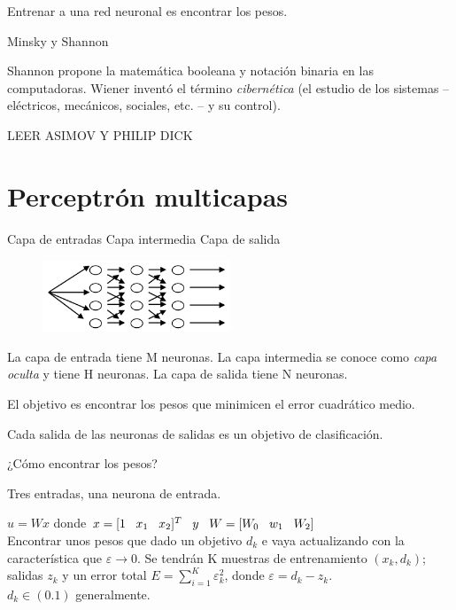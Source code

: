 \begin{nota} Entrenar a una red neuronal es encontrar los pesos. \end{nota}


Minsky y Shannon

Shannon propone la matemática booleana y notación binaria en las computadoras.
Wiener inventó el término \textit{cibernética} (el estudio de los sistemas – eléctricos, mecánicos, sociales, etc. – y su control).


LEER ASIMOV Y PHILIP DICK

\section{Perceptrón multicapas}

Capa de entradas
Capa intermedia
Capa de salida

\begin{figure}[h!]
	\centering
	\includegraphics[width=0.5\textwidth]{images/img76.png}
	\label{figura76}
\end{figure}

La capa de entrada tiene M neuronas.
La capa intermedia se conoce como \textit{capa oculta} y tiene H neuronas.
La capa de salida tiene N neuronas.

El objetivo es encontrar los pesos que minimicen el error cuadrático medio.


Cada salida de las neuronas de salidas es un objetivo de clasificación.

\begin{ejemplo}
	
¿Cómo encontrar los pesos?

Tres entradas, una neurona de entrada.

$u=Wx$ donde $x = [1 \hspace{0.3cm} x_1 \hspace{0.3cm}  x_2]^T \hspace{0.3cm} y \hspace{0.3cm} W= [W_0 \hspace{0.3cm} w_1 \hspace{0.3cm} W_2]$
\\

Encontrar unos pesos que dado un objetivo $d_k$ e vaya actualizando con la característica que $\varepsilon \rightarrow 0$. Se
tendrán K muestras de entrenamiento $(x_k,d_k)$; salidas $z_k$ y un error total $E= \sum_{i=1}^{K}  \varepsilon_k^2$, donde $\varepsilon= d_k - z_k$.
\\

$d_k \in (0.1)$ generalmente. 

\end{ejemplo}


